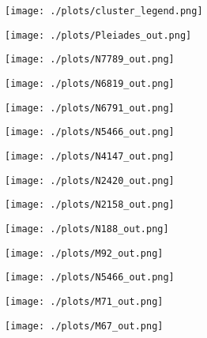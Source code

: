 \documentclass[12pt, preprint]{aastex}
\begin{document}
\begin{figure}
  \texttt{[image: ./plots/cluster\_legend.png]}
  \end{figure}
\begin{figure}
  \texttt{[image: ./plots/Pleiades\_out.png]}
  \end{figure}
\begin{figure}[h!]
  \texttt{[image: ./plots/N7789\_out.png]}
  \end{figure}
\begin{figure}[h!]
  \texttt{[image: ./plots/N6819\_out.png]}
  \end{figure}
\begin{figure}[h!]
  \texttt{[image: ./plots/N6791\_out.png]}
  \end{figure}
\begin{figure}[h!]
  \texttt{[image: ./plots/N5466\_out.png]}
  \end{figure}
\begin{figure}[h!]
  \texttt{[image: ./plots/N4147\_out.png]}
  \end{figure}
\begin{figure}[h!]
  \texttt{[image: ./plots/N2420\_out.png]}
  \end{figure}
\begin{figure}[h!]
  \texttt{[image: ./plots/N2158\_out.png]}
  \end{figure}
\begin{figure}[h!]
  \texttt{[image: ./plots/N188\_out.png]}
  \end{figure}
\begin{figure}[h!]
  \texttt{[image: ./plots/M92\_out.png]}
  \end{figure}
\begin{figure}[h!]
  \texttt{[image: ./plots/N5466\_out.png]}
    \end{figure}
\begin{figure}[h!]
  \texttt{[image: ./plots/M71\_out.png]}
    \end{figure}
    
\begin{figure}[h!]
  \texttt{[image: ./plots/M67\_out.png]}
    \end{figure}
\end{document}
